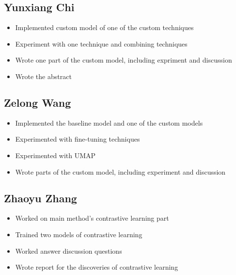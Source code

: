\documentclass{article}
\begin{document}
    \subsection*{Yunxiang Chi}
    \begin{itemize}
        \item Implemented custom model of one of the custom techniques
        \item Experiment with one technique and combining techniques
        \item Wrote one part of the custom model, including expriment and discussion
        \item Wrote the abstract
    \end{itemize}

    \subsection*{Zelong Wang}
    \begin{itemize}
        \item Implemented the baseline model and one of the custom models
        \item Experimented with fine-tuning techniques
        \item Experimented with UMAP
        \item Wrote parts of the custom model, including experiment and discussion
    \end{itemize}

    \subsection*{Zhaoyu Zhang}
    \begin{itemize}
        \item Worked on main method's contrastive learning part
        \item Trained two models of contrastive learning 
        \item Worked answer discussion questions
        \item Wrote report for the discoveries of contrastive learning
    \end{itemize}
\end{document}
